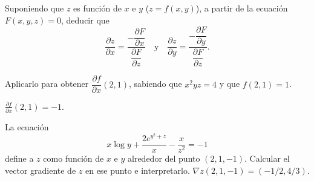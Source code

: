 
{Suponiendo que $z$ es función de $x$ e $y$ ($z=f(x,y)$), a partir de la ecuación $F(x,y,z)=0$, deducir que 
\[
\frac{\partial z}{\partial x} = \frac{-\dfrac{\partial F}{\partial x}}{\dfrac{\partial F}{\partial z}}
\quad \mbox{y} \quad
\frac{\partial z}{\partial y} = \frac{-\dfrac{\partial F}{\partial y}}{\dfrac{\partial F}{\partial z}}.
\]

Aplicarlo para obtener $\dfrac{\partial f}{\partial x}(2,1)$, sabiendo que $x^2yz=4$ y que $f(2,1)=1$.
}
{$\frac{\partial f}{\partial x}(2,1)=-1.$
}
{
}

{La ecuación 
\[
x\log y+\frac{2e^{y^2+z}}{x} - \frac{x}{z^2} = -1
\] 
define a $z$ como función de $x$ e $y$ alrededor del punto $(2,1,-1)$. 
Calcular el vector gradiente de $z$ en ese punto e interpretarlo.
}
{$\nabla z(2,1,-1) = (-1/2,4/3)$.
}
{
}